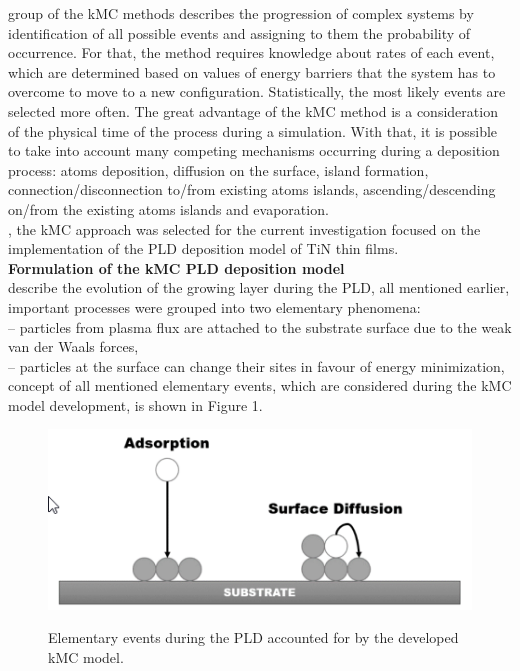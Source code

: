\documentclass[journal,article,submit,pdftex,moreauthors]{Definitions/mdpi}
\begin{document}
 group of the kMC methods describes the progression of complex systems by identification of all possible events and assigning to them the probability of occurrence. For that, the method requires knowledge about rates of each event, which are determined based on values of energy barriers that the system has to overcome to move to a new configuration. Statistically, the most likely events are selected more often. The great advantage of the kMC method is a consideration of the physical time of the process during a simulation. With that, it is possible to take into account many competing mechanisms occurring during a deposition process: atoms deposition, diffusion on the surface, island formation, connection/disconnection to/from existing atoms islands, ascending/descending on/from the existing atoms islands and evaporation.\\
, the kMC approach was selected for the current investigation focused on the implementation of the PLD deposition model of TiN thin films.\\
 
\noindent\textbf{Formulation of the kMC PLD deposition model}\\
 describe the evolution of the growing layer during the PLD, all mentioned earlier, important processes were grouped into two elementary phenomena:\\
 – particles from plasma flux are attached to the substrate surface due to the weak van der Waals forces,\\ 
 – particles at the surface can change their sites in favour of energy minimization,\\ 
 concept of all mentioned elementary events, which are considered during the kMC model development, is shown in Figure 1.
 
\begin{figure}[h]
  \captionsetup{justification=centering}
  \centering
  \includegraphics{Definitions/picture1.png}
  \label{fig:obraz1}
    \caption{Elementary events during the PLD accounted for by the developed kMC model.}
    \end{figure}   
\unskip
 
\end{document}
